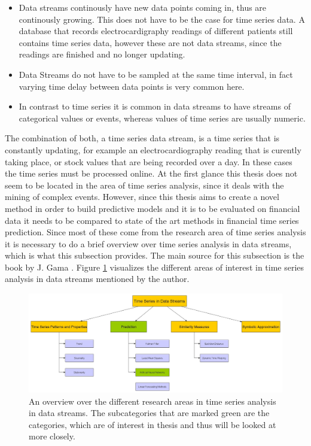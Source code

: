 \begin{itemize}
	\item Data streams continously have new data points coming in, thus are continously growing. This does not have to be the case for time series data. A database that records electrocardigraphy readings of different patients still contains time series data, however these are not data streams, since the readings are finished and no longer updating.
	\item Data Streams do not have to be sampled at the same time interval, in fact varying time delay between data points is very common here.
	\item In contrast to time series it is common in data streams to have streams of categorical values or events, whereas values of time series are usually numeric.
\end{itemize}

The combination of both, a time series data stream, is a time series that is constantly updating, for example an electrocardiography reading that is curently taking place, or stock values that are being recorded over a day. In these cases the time series must be processed online. \newline
At the first glance this thesis does not seem to be located in the area of time series analysis, since it deals with the mining of complex events. However, since this thesis aims to create a novel method in order to build predictive models and it is to be evaluated on financial data it needs to be compared to state of the art methods in financial time series prediction. Since most of these come from the research area of time series analysis it is necessary to do a brief overview over time series analysis in data streams, which is what this subsection provides. 
The main source for this subsection is the book by J. Gama \cite{gama2010knowledge}. Figure \ref{fig_timeSeriesInDataStreamsOverview} visualizes the different areas of interest in time series analysis in data streams mentioned by the author. 

\begin{figure}[h]
	\centering
  	\includegraphics[width=\textwidth]{timeSeriesInDataStreamsOverview}
	\caption{An overview over the different research areas in time series analysis in data streams. The subcategories that are marked green are the categories, which are of interest in thesis and thus will be looked at more closely.}
	\label{fig_timeSeriesInDataStreamsOverview}
\end{figure}

